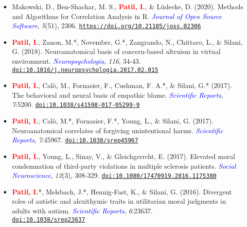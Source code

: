 \documentclass[10pt]{article}
\begin{document}
\begin{itemize}
    \item Makowski, D., Ben-Shachar,  M. S., \textbf{\textcolor{red}{Patil, I.}}, \& Lüdecke, D. (2020). Methods and Algorithms for Correlation Analysis in R. \textit{\textcolor{blue}{Journal of Open Source Software}}, \textit{5}(51), 2306. \href{https://joss.theoj.org/papers/10.21105/joss.02306}{\tt https://doi.org/10.21105/joss.02306}
	
	\item \textbf{\textcolor{red}{Patil, I.}}, Zanon, M.*, Novembre, G.*, Zangrando, N., Chittaro, L., \& Silani, G. (2018). Neuroanatomical basis of concern-based altruism in virtual environment. \textit{\textcolor{blue}{Neuropsychologia}}, \textit{116}, 34-43. \href{https://drive.google.com/open?id=0B6_u70YpdJKnWU0zblpBOUMxRXc}{\tt doi:10.1016/j.neuropsychologia.2017.02.015}
		
	\item \textbf{\textcolor{red}{Patil, I.}}, Cal\`{o}, M., Fornasier, F., Cushman, F. A.*, \& Silani, G.* (2017). The behavioral and neural basis of empathic blame. 
 \textit{\textcolor{blue}{Scientific Reports}}, \textit{7}:5200. \href{https://drive.google.com/open?id=0B6_u70YpdJKnT1J6dkk5R1NPZDg}{\tt doi:10.1038/s41598-017-05299-9}
	
	\item \textbf{\textcolor{red}{Patil, I.}}, Cal\`{o}, M.*, Fornasier, F.*, Young, L., \& Silani, G. (2017). Neuroanatomical correlates of forgiving unintentional harms. \textit{\textcolor{blue}{Scientific Reports}}, \textit{7}:45967. \href{https://drive.google.com/open?id=0B6_u70YpdJKnRV81UnNlZHdrdXM}{\tt doi:10.1038/srep45967}
	
	\item \textbf{\textcolor{red}{Patil, I.}}, Young, L., Sinay, V., \& Gleichgerrcht, E. (2017). Elevated moral condemnation of third-party violations in multiple sclerosis patients. \textit{\textcolor{blue}{Social Neuroscience}}, \textit{12}(3), 308-329. \href{https://drive.google.com/open?id=0B6_u70YpdJKnT3M0bWpPdDY4RHc}{\tt doi:10.1080/17470919.2016.1175380}
	
	\item \textbf{\textcolor{red}{Patil, I.}}*, Melsbach, J.*, Hennig-Fast, K., \& Silani, G. (2016). Divergent roles of autistic and alexithymic traits in utilitarian moral judgments in adults with autism. \textit{\textcolor{blue}{Scientific Reports}}, \textit{6}:23637.\\
	\href{https://drive.google.com/file/d/0B6_u70YpdJKnV1p2UmNwa09iS1k/view?usp=sharing}{\tt doi:10.1038/srep23637}
	

\end{itemize}
\end{document}
